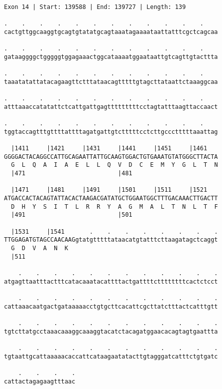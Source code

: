 \documentclass{article}
\begin{document}
\newpage
\begin{Verbatim}
Exon 14 | Start: 139588 | End: 139727 | Length: 139
 
.    .    .    .    .    .    .    .    .    .    .    .    
cactgttggcaaggtgcagtgtatatgcagtaaatagaaaataattatttcgctcagcaa
  
.    .    .    .    .    .    .    .    .    .    .    .    
gataaggggctgggggtggagaaactggcataaaatggaataattgtcagttgtacttta
  
.    .    .    .    .    .    .    .    .    .    .    .    
taaatatattatacagaagttctttataacagtttttgtagcttataattctaaaggcaa
  
.    .    .    .    .    .    .    .    .    .    .    .    
atttaaaccatatattctcattgattgagtttttttttcctagtatttaagttaccaact
  
.    .    .    .    .    .    .    .    .    .    .    .    
tggtaccagtttgttttattttagatgattgtctttttcctcttgccctttttaaattag
  
  |1411     |1421     |1431     |1441     |1451     |1461   
GGGGACTACAGGCCATTGCAGAATTATTGCAAGTGGACTGTGAAATGTATGGGCTTACTA
  G  L  Q  A  I  A  E  L  L  Q  V  D  C  E  M  Y  G  L  T  N
  |471                          |481                        
  
  |1471     |1481     |1491     |1501     |1511     |1521   
ATGACCACTACAGTATTACACTAAGACGATATGCTGGAATGGCTTTGACAAACTTGACTT
  D  H  Y  S  I  T  L  R  R  Y  A  G  M  A  L  T  N  L  T  F
  |491                          |501                        
  
  |1531     |1541       .    .    .    .    .    .    .    .
TTGGAGATGTAGCCAACAAGgtatgtttttataacatgtatttcttaagatagctcaggt
  G  D  V  A  N  K                                          
  |511                                                      
  
    .    .    .    .    .    .    .    .    .    .    .    .
atgagttaatttactttcatacaaatacattttactgattttcttttttttcactctcct
  
    .    .    .    .    .    .    .    .    .    .    .    .
cattaaacaatgactgataaaaacctgtgcttcacattcgcttatctttactcatttgtt
  
    .    .    .    .    .    .    .    .    .    .    .    .
tgtcttatgcctaaacaaaggcaaaggtacatctacagatggaacacagtagtgaattta
  
    .    .    .    .    .    .    .    .    .    .    .    .
tgtaattgcattaaaaacaccattcataagaatatacttgtagggatcatttctgtgatc
  
    .    .    .    .
cattactagagaagtttaac
\end{Verbatim}
\end{document}
